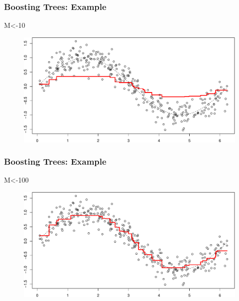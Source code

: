 \documentclass[
  shownotes,
  xcolor={svgnames},
  hyperref={colorlinks,citecolor=DarkBlue,linkcolor=DarkRed,urlcolor=DarkBlue}
  , aspectratio=169]{beamer}
\newenvironment{Shaded}{\begin{snugshade}}{\end{snugshade}}
\newcommand{\DecValTok}[1]{\textcolor[rgb]{0.00,0.00,0.81}{#1}}
\newcommand{\NormalTok}[1]{#1}
\begin{document}
\begin{frame}[fragile]
\frametitle{Boosting Trees: Example}

\begin{Shaded}
\begin{Highlighting}[]
\NormalTok{M\textless{}{-}}\DecValTok{10}
\end{Highlighting}
\end{Shaded}

\begin{figure}[H] \centering
            \captionsetup{justification=centering}
              \includegraphics[scale=0.5]{figures/unnamed-chunk-6-1.pdf}
 \end{figure}
 \end{frame}
\begin{frame}[fragile]
\frametitle{Boosting Trees: Example}

\begin{Shaded}
\begin{Highlighting}[]
\NormalTok{M\textless{}{-}}\DecValTok{100}
\end{Highlighting}
\end{Shaded}

\begin{figure}[H] \centering
            \captionsetup{justification=centering}
              \includegraphics[scale=0.5]{figures/unnamed-chunk-7-1.pdf}
 \end{figure}

 \end{frame}
\end{document}
